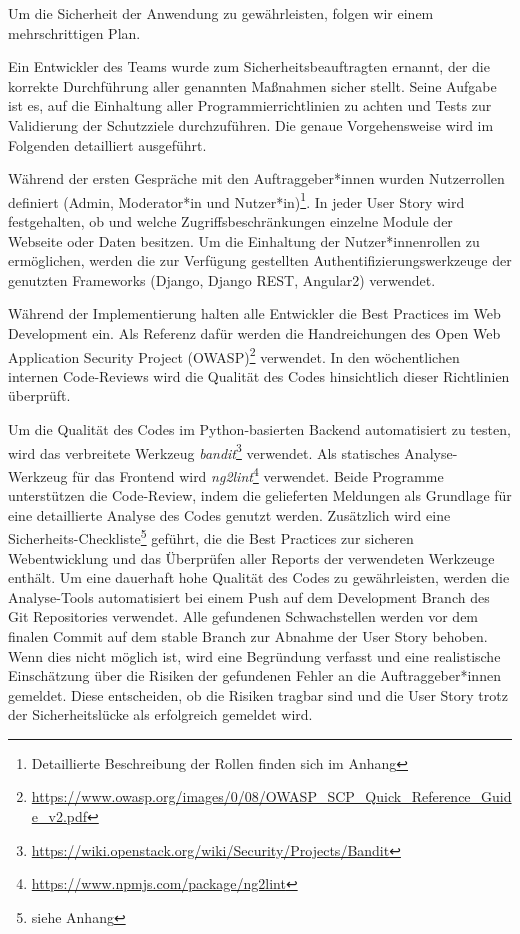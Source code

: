 \documentclass[accentcolor=tud0b,12pt,paper=a4]{tudreport}
\begin{document}
Um die Sicherheit der Anwendung zu gewährleisten, folgen wir einem mehrschrittigen Plan.

Ein Entwickler des Teams wurde zum Sicherheitsbeauftragten ernannt, der die korrekte Durchführung aller genannten Maßnahmen sicher stellt. Seine Aufgabe ist es, auf die Einhaltung aller Programmierrichtlinien zu achten und Tests zur Validierung der Schutzziele durchzuführen. Die genaue Vorgehensweise wird im Folgenden detailliert ausgeführt.

Während der ersten Gespräche mit den Auftraggeber*innen wurden Nutzerrollen definiert (Admin, Moderator*in und Nutzer*in)\footnote{Detaillierte Beschreibung der Rollen finden sich im Anhang}. In jeder User Story wird festgehalten, ob und welche Zugriffsbeschränkungen einzelne Module der Webseite oder Daten besitzen. Um die Einhaltung der Nutzer*innenrollen zu ermöglichen, werden die zur Verfügung gestellten Authentifizierungswerkzeuge der genutzten Frameworks (Django, Django REST, Angular2) verwendet.

Während der Implementierung halten alle Entwickler die Best Practices im Web Development ein. Als Referenz dafür werden die Handreichungen des Open Web Application Security Project (OWASP)\footnote{\href{https://www.owasp.org/images/0/08/OWASP_SCP_Quick_Reference_Guide_v2.pdf}{https://www.owasp.org/images/0/08/OWASP\_SCP\_Quick\_Reference\_Guide\_v2.pdf}} verwendet. In den wöchentlichen internen Code-Reviews wird die Qualität des Codes hinsichtlich dieser Richtlinien überprüft.

Um die Qualität des Codes im Python-basierten Backend automatisiert zu testen, wird das verbreitete Werkzeug \emph{bandit}\footnote{\href{https://wiki.openstack.org/wiki/Security/Projects/Bandit}{https://wiki.openstack.org/wiki/Security/Projects/Bandit}} verwendet. Als statisches Analyse-Werkzeug für das Frontend wird \emph{ng2lint}\footnote{\href{https://www.npmjs.com/package/ng2lint}{https://www.npmjs.com/package/ng2lint}} verwendet. Beide Programme unterstützen die Code-Review, indem die gelieferten Meldungen als Grundlage für eine detaillierte Analyse des Codes genutzt werden. Zusätzlich wird eine Sicherheits-Checkliste\footnote{siehe Anhang} geführt, die die Best Practices zur sicheren Webentwicklung und das Überprüfen aller Reports der verwendeten Werkzeuge enthält. Um eine dauerhaft hohe Qualität des Codes zu gewährleisten, werden die Analyse-Tools automatisiert bei einem Push auf dem Development Branch des Git Repositories verwendet. Alle gefundenen Schwachstellen werden vor dem finalen Commit auf dem stable Branch zur Abnahme der User Story behoben. Wenn dies nicht möglich ist, wird eine Begründung verfasst und eine realistische Einschätzung über die Risiken der gefundenen Fehler an die Auftraggeber*innen gemeldet. Diese entscheiden, ob die Risiken tragbar sind und die User Story trotz der Sicherheitslücke als erfolgreich gemeldet wird.
\end{document}
